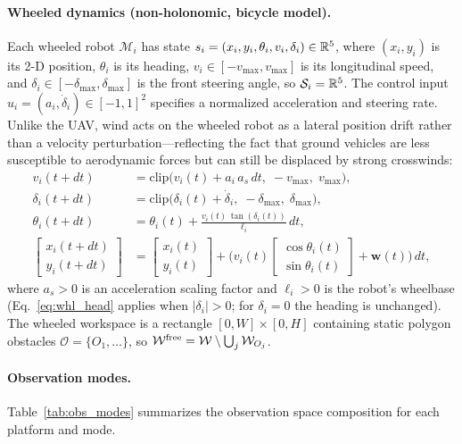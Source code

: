 \documentclass{article}
\providecommand{\obst}{\mathcal{O}}
\providecommand{\free}{\mathrm{free}}
\begin{document}
\paragraph{Wheeled dynamics (non-holonomic, bicycle model).}
Each wheeled robot $\mathcal{M}_i$ has state $s_i = (x_i, y_i, \theta_i, v_i, \delta_i) \in \mathbb{R}^5$, where $(x_i, y_i)$ is its 2-D position, $\theta_i$ is its heading, $v_i \in [-v_{\max}, v_{\max}]$ is its longitudinal speed, and $\delta_i \in [-\delta_{\max}, \delta_{\max}]$ is the front steering angle, so $\mathcal{S}_i = \mathbb{R}^5$. The control input $u_i = (a_i, \dot{\delta}_i) \in [-1,1]^2$ specifies a normalized acceleration and steering rate. Unlike the UAV, wind acts on the wheeled robot as a lateral position drift rather than a velocity perturbation---reflecting the fact that ground vehicles are less susceptible to aerodynamic forces but can still be displaced by strong crosswinds:
\begin{align}
    v_i(t+dt) &= \text{clip}\!\big( v_i(t) + a_i\,a_s\,dt,\; -v_{\max},\; v_{\max}\big), \label{eq:whl_vel} \\
    \delta_i(t+dt) &= \text{clip}\!\big( \delta_i(t) + \dot{\delta}_i,\; -\delta_{\max},\; \delta_{\max}\big), \label{eq:whl_steer} \\
    \theta_i(t+dt) &= \theta_i(t) + \tfrac{v_i(t)\,\tan(\delta_i(t))}{\ell_i}\,dt, \label{eq:whl_head} \\
    \begin{bmatrix} x_i(t+dt) \\ y_i(t+dt) \end{bmatrix} &=
    \begin{bmatrix} x_i(t) \\ y_i(t) \end{bmatrix}
    + \Big( v_i(t)\!\begin{bmatrix}\cos\theta_i(t)\\\sin\theta_i(t)\end{bmatrix} + \mathbf{w}(t) \Big)\,dt, \label{eq:whl_pos}
\end{align}
where $a_s > 0$ is an acceleration scaling factor and $\ell_i > 0$ is the robot's wheelbase (Eq.~\eqref{eq:whl_head} applies when $|\delta_i| > 0$; for $\delta_i = 0$ the heading is unchanged). The wheeled workspace is a rectangle $[0, W]\times[0, H]$ containing static polygon obstacles $\obst = \{O_1, \ldots\}$, so $\wspace^{\free} = \wspace \setminus \bigcup_j \wspace_{O_j}$.

\paragraph{Observation modes.}
Table~\ref{tab:obs_modes} summarizes the observation space composition for each platform and mode.
\end{document}
